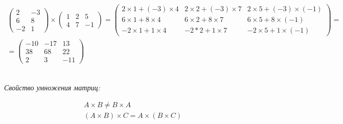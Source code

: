 \documentclass[a4paper, 11pt, oneside]{article}
\begin{document}
\begin{gather*}
	\begin{pmatrix}
		2& -3\\
		6& 8\\
		-2& 1
	\end{pmatrix}
	\times
	\begin{pmatrix}
		1& 2& 5\\
		4& 7& -1
	\end{pmatrix}
	=
	\begin{pmatrix}
		2\times 1+(-3)\times 4& 2\times 2+(-3)\times 7& 2\times 5+(-3)\times (-1)\\
		6\times 1+8\times 4& 6\times 2+8\times 7& 6\times 5+8\times (-1)\\
		-2\times 1+1\times 4& -2*2+1\times 7& -2\times 5+1\times (-1)
	\end{pmatrix}
	=\\=
	\begin{pmatrix}
		-10& -17& 13\\
		38& 68& 22\\
		2& 3& -11
	\end{pmatrix}
\end{gather*}
\\
\begin{center}
	{\itshape Свойство умножения матриц:}
\end{center}
\begin{gather*}
	A\times B \not= B\times A\\
	(A\times B)\times C = A\times (B\times C)
\end{gather*}
\end{document}
